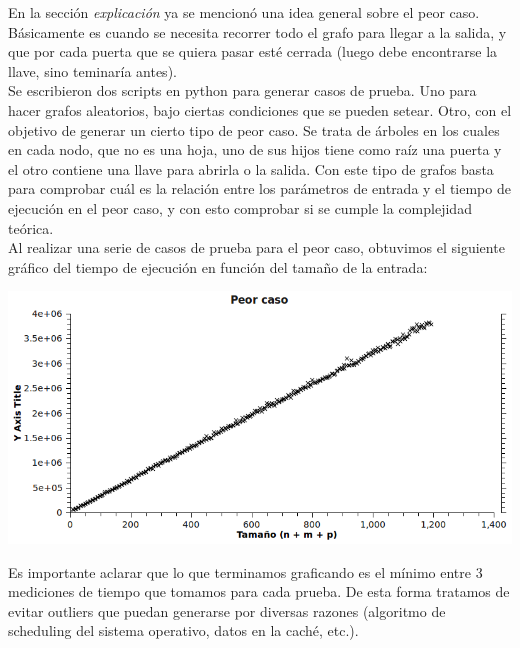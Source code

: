 En la sección \textit{explicación} ya se mencionó una idea general sobre el peor caso. Básicamente es cuando se necesita recorrer todo el grafo para llegar a la salida, y que por cada puerta que se quiera pasar esté cerrada (luego debe encontrarse la llave, sino teminaría antes). \\

Se escribieron dos scripts en python para generar casos de prueba. Uno para hacer grafos aleatorios, bajo ciertas condiciones que se pueden setear. Otro, con el objetivo de generar un cierto tipo de peor caso. Se trata de árboles en los cuales en cada nodo, que no es una hoja, uno de sus hijos tiene como raíz una puerta y el otro contiene una llave para abrirla o la salida. Con este tipo de grafos basta para comprobar cuál es la relación entre los parámetros de entrada y el tiempo de ejecución en el peor caso, y con esto comprobar si se cumple la complejidad teórica. \\

Al realizar una serie de casos de prueba para el peor caso, obtuvimos el siguiente gráfico del tiempo de ejecución en función del tamaño de la entrada: \\

\begin{center}
\includegraphics[scale=0.75]{img/ej3/peor_caso.png} 
\end{center}

Es importante aclarar que lo que terminamos graficando es el mínimo entre 3 mediciones de tiempo que tomamos para cada prueba. De esta forma tratamos de evitar outliers que puedan generarse por diversas razones (algoritmo de scheduling del sistema operativo, datos en la caché, etc.). \\
